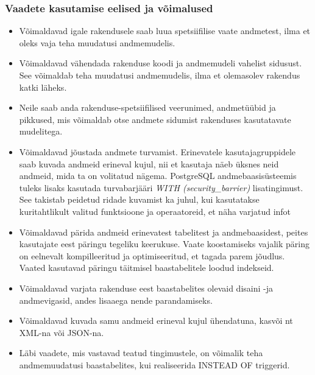 \documentclass[a4paper,12pt]{article} %
\begin{document}
\subsubsection{Vaadete kasutamise eelised ja võimalused}
\begin{itemize}
\item Võimaldavad igale rakendusele saab luua spetsiifilise vaate andmetest, ilma et oleks vaja teha muudatusi andmemudelis.
\item Võimaldavad vähendada rakenduse koodi ja andmemudeli vahelist sidusust.
See võimaldab teha muudatusi andmemudelis, ilma et olemasolev rakendus katki läheks.
\item Neile saab anda rakenduse-spetsiifilised veerunimed, andmetüübid ja pikkused, mis võimaldab otse andmete sidumist rakenduses kasutatavate mudelitega.
\item Võimaldavad jõustada andmete turvamist. Erinevatele kasutajagruppidele saab kuvada andmeid erineval kujul, nii et kasutaja näeb üksnes neid andmeid, mida ta on volitatud nägema. PostgreSQL andmebaasisüsteemis tuleks lisaks kasutada turvabarjääri \textit{WITH (security\_barrier)} lisatingimust. See takistab peidetud ridade kuvamist ka juhul, kui kasutatakse kuritahtlikult valitud funktsioone ja operaatoreid, et näha varjatud infot \cite{PostgreSQLRulesAndPrivileges}
\item Võimaldavad pärida andmeid erinevatest tabelitest ja andmebaasidest, peites kasutajate eest päringu tegeliku keerukuse. Vaate koostamiseks vajalik päring on eelnevalt kompilleeritud ja optimiseeritud, et tagada parem jõudlus. Vaated kasutavad päringu täitmisel baastabelitele loodud indekseid.
\item Võimaldavad varjata rakenduse eest baastabelites olevaid disaini -ja andmevigasid, andes lisaaega nende parandamiseks.
\item Võimaldavad kuvada samu andmeid erineval kujul ühendatuna, kasvõi nt XML-na või JSON-na.
\item Läbi vaadete, mis vastavad teatud tingimustele, on võimalik teha andmemuudatusi baastabelites, kui realiseerida INSTEAD OF triggerid.
\end{itemize}
\cite[lk 172-173]{BuildingTheAgileDatabase}
\end{document}
